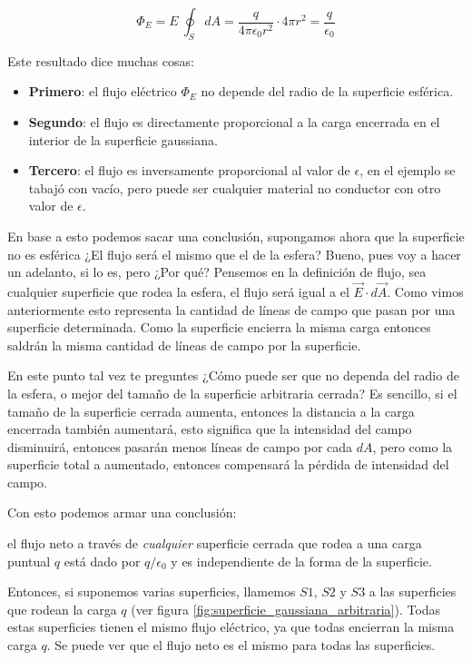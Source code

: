 \[
\Phi_E = E ~ \oint_S dA = \frac{q}{4\pi \epsilon_0 r^2} \cdot 4\pi r^2 = \boxed{\frac{q}{\epsilon_0}} 
\]

Este resultado dice muchas cosas:
\begin{itemize}
    \item \textbf{Primero}: el flujo eléctrico \(\Phi_E\) no depende del radio de la superficie esférica.
    \item \textbf{Segundo}: el flujo es directamente proporcional a la carga encerrada en el interior de la superficie gaussiana.
    \item \textbf{Tercero}: el flujo es inversamente proporcional al valor de \(\epsilon\), en el ejemplo se tabajó con vacío, pero puede ser cualquier material no conductor con otro valor de \(\epsilon\).
\end{itemize}

En base a esto podemos sacar una conclusión, supongamos ahora que la superficie no es esférica ¿El flujo será el mismo que el de la esfera? Bueno, pues voy a hacer un adelanto, si lo es, pero ¿Por qué? Pensemos en la definición de flujo, sea cualquier superficie que rodea la esfera, el flujo será igual a el \(\vec{E}\cdot d\vec{A}\). Como vimos anteriormente esto representa la cantidad de líneas de campo que pasan por una superficie determinada. Como la superficie encierra la misma carga entonces saldrán la misma cantidad de líneas de campo por la superficie.

En este punto tal vez te preguntes ¿Cómo puede ser que no dependa del radio de la esfera, o mejor del tamaño de la superficie arbitraria cerrada? Es sencillo, si el tamaño de la superficie cerrada aumenta, entonces la distancia a la carga encerrada también aumentará, esto significa que la intensidad del campo disminuirá, entonces pasarán menos líneas de campo por cada \(dA\), pero como la superficie total a aumentado, entonces compensará la pérdida de intensidad del campo.

Con esto podemos armar una conclusión:

\begin{tcolorbox}[myconclusion]
    el flujo neto a través de \textit{cualquier} superficie cerrada que rodea a una carga puntual \(q\) está dado por \(q/\epsilon_0\) y es independiente de la forma de la superficie.
\end{tcolorbox}

Entonces, si suponemos varias superficies, llamemos \(S1\), \(S2\) y \(S3\) a las superficies que rodean la carga \(q\) (ver figura \ref{fig:superficie_gaussiana_arbitraria}). Todas estas superficies tienen el mismo flujo eléctrico, ya que todas encierran la misma carga \(q\). Se puede ver que el flujo neto es el mismo para todas las superficies.

